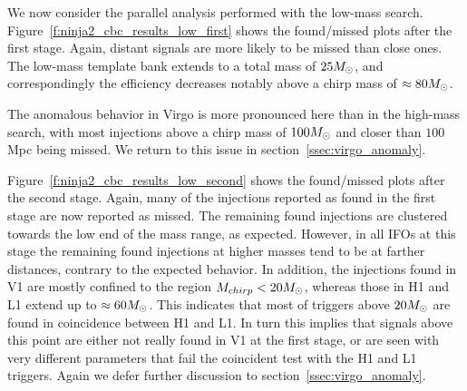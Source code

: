 We now consider the parallel analysis performed with the low-mass
search.  Figure~\ref{f:ninja2_cbc_results_low_first} shows the
found/missed plots after the first stage.  Again, distant signals are
more likely to be missed than close ones.  The low-mass template bank
extends to a total mass of $25M_\odot$, and correspondingly the
efficiency decreases notably above a chirp mass of $\approx 80 M_\odot$.

The anomalous behavior in Virgo is more pronounced here than in the
high-mass search, with most injections above a chirp mass of $100
M_\odot$ and closer than $100$ Mpc being missed.  We return to this
issue in section~\ref{ssec:virgo_anomaly}.

Figure~\ref{f:ninja2_cbc_results_low_second} shows the found/missed
plots after the second stage.  Again, many of the injections reported
as found in the first stage are now reported as missed.  The remaining
found injections are clustered towards the low end of the mass range,
as expected.  However, in all IFOs at this stage the remaining found
injections at higher masses tend to be at farther distances, contrary
to the expected behavior.  In addition, the injections found in V1 are
mostly confined to the region $M_{chirp} < 20 M_\odot$, whereas those in
H1 and L1 extend up to $\approx 60 M_\odot$.  This indicates that most
of triggers above $20 M_\odot$ are found in coincidence between H1 and
L1.  In turn this implies that signals above this point are either not
really found in V1 at the first stage, or are seen with very different 
parameters that fail the coincident test with the H1 and L1 triggers.
Again we defer further discussion to section~\ref{ssec:virgo_anomaly}.


